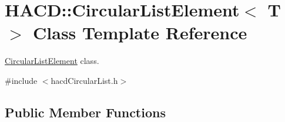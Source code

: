 \hypertarget{class_h_a_c_d_1_1_circular_list_element}{\section{H\+A\+C\+D\+:\+:Circular\+List\+Element$<$ T $>$ Class Template Reference}
\label{class_h_a_c_d_1_1_circular_list_element}
}


\hyperlink{class_h_a_c_d_1_1_circular_list_element}{Circular\+List\+Element} class.  




{\ttfamily \#include $<$hacd\+Circular\+List.\+h$>$}

\subsection*{Public Member Functions}
